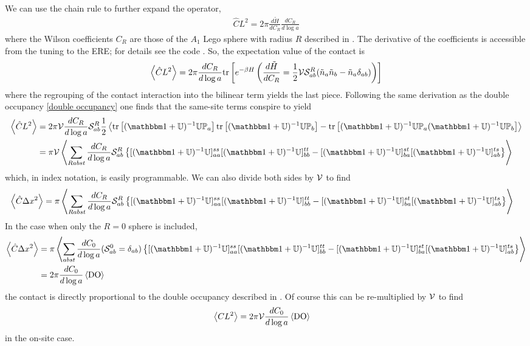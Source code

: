 We can use the chain rule to further expand the operator,
\begin{align}
    \hat{C}L^2 = 2\pi \frac{d\tilde{H}}{d C_R} \frac{d C_R}{d\log a} 
\end{align}
where the Wilson coefficients $C_R$ are those of the $A_1$ Lego sphere with radius $R$ described in .
The derivative of the coefficients is accessible from the tuning to the ERE; for details see the code .
So, the expectation value of the contact is
\begin{align}
    \left\langle \hat{C} L^2 \right\rangle
    = 2 \pi \frac{d C_R}{d\log a} \text{tr}\left[e^{-\beta H} \left(\frac{d\tilde{H}}{d C_R} = \frac{1}{2} \mathcal{V} \mathcal{S}^{R}_{ab} (\tilde{n}_a \tilde{n}_b - \tilde{n}_a \delta_{ab}) \right)\right]
    \label{eq:contact generic}
\end{align}
where the regrouping of the contact interaction into the bilinear term yields the last piece.
Following the same derivation as the double occupancy \eqref{double occupancy} one finds that the same-site terms conspire to yield
\begin{align}
    \expectation{\hat{C} L^2}
    &= 2 \pi \Volume \frac{d C_R}{d\log a} \LegoSphere{R}_{ab} \half\expectation{\tr{(\one + \UU)\inverse \UU \PP_a}\tr{(\one + \UU)\inverse \UU \PP_b} - \tr{(\one+\UU)\inverse \UU \PP_a (\one+\UU)\inverse \UU \PP_b}}
    \nonumber\\
    &= \pi\Volume \expectation{\sum_{Rabst} \frac{d C_R}{d\log a} \LegoSphere{R}_{ab} \left\{[(\one+\UU)\inverse \UU]^{ss}_{aa} [(\one+\UU)\inverse \UU]^{tt}_{bb} - [(\one+\UU)\inverse \UU]^{st}_{ba} [(\one+\UU)\inverse \UU]^{ts}_{ab} \right\}}
\end{align}
which, in index notation, is easily programmable.
We can also divide both sides by $\mathcal{V}$ to find
\begin{align}
    \expectation{\hat{C} \Delta x^2}
    &= \pi \expectation{\sum_{Rabst} \frac{d C_R}{d\log a} \LegoSphere{R}_{ab} \left\{[(\one+\UU)\inverse \UU]^{ss}_{aa} [(\one+\UU)\inverse \UU]^{tt}_{bb} - [(\one+\UU)\inverse \UU]^{st}_{ba} [(\one+\UU)\inverse \UU]^{ts}_{ab} \right\}}
\end{align}
In the case when only the $R=0$ sphere is included,
\begin{align}
    \expectation{\hat{C} \Delta x^2}
    &= \pi \expectation{\sum_{abst} \frac{d C_0}{d\log a} (\LegoSphere{0}_{ab} = \delta_{ab}) \left\{[(\one+\UU)\inverse \UU]^{ss}_{aa} [(\one+\UU)\inverse \UU]^{tt}_{bb} - [(\one+\UU)\inverse \UU]^{st}_{ba} [(\one+\UU)\inverse \UU]^{ts}_{ab} \right\}}
    \nonumber\\
    &= 2\pi \frac{d C_0}{d\log a} \expectation{ \DoubleOccupancy }
\end{align}
the contact is directly proportional to the double occupancy described in .
Of course this can be re-multiplied by $\mathcal{V}$ to find
\begin{align}
    \left\langle CL^2 \right\rangle
    &= 2\pi \mathcal{V} \frac{d C_0}{d\log a} \left\langle  \textrm{DO}  \right\rangle
\end{align}
in the on-site case.

